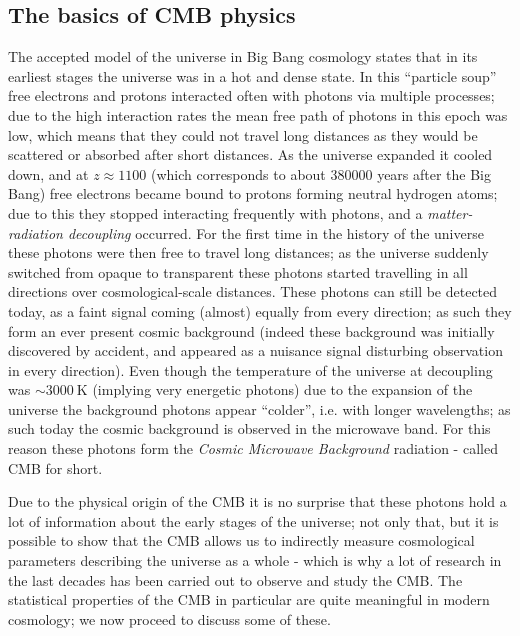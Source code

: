 \subsection{The basics of CMB physics}
The accepted model of the universe in Big Bang cosmology states that in its earliest stages the universe was in a hot and dense state. In this ``particle soup'' free electrons and protons interacted often with photons via multiple processes; due to the high interaction rates the mean free path of photons in this epoch was low, which means that they could not travel long distances as they would be scattered or absorbed after short distances. As the universe expanded it cooled down, and at $z\approx 1100$ (which corresponds to about 380000 years after the  Big Bang) free electrons became bound to protons forming neutral hydrogen atoms; due to this they stopped interacting frequently with photons, and a \emph{matter-radiation decoupling} occurred. For the first time in the history of the universe these photons were then free to travel long distances; as the universe suddenly switched from opaque to transparent these photons started travelling in all directions over cosmological-scale distances. These photons can still be detected today, as a faint signal coming (almost) equally from every direction; as such they form an ever present cosmic background (indeed these background was initially discovered by accident, and appeared as a nuisance signal disturbing observation in every direction). Even though the temperature of the universe at decoupling was $\sim 3000 \ \mathrm{K}$ (implying very energetic photons) due to the expansion of the universe the background photons appear ``colder'', i.e. with longer wavelengths; as such today the cosmic background is observed in the microwave band. For this reason these photons form the \emph{Cosmic Microwave Background} radiation - called CMB for short.

Due to the physical origin of the CMB it is no surprise that these photons hold a lot of information about the early stages of the universe; not only that, but it is possible to show that the CMB allows us to indirectly measure cosmological parameters describing the universe as a whole - which is why a lot of research in the last decades has been carried out to observe and study the CMB. The statistical properties of the CMB in particular are quite meaningful in modern cosmology; we now proceed to discuss some of these.

